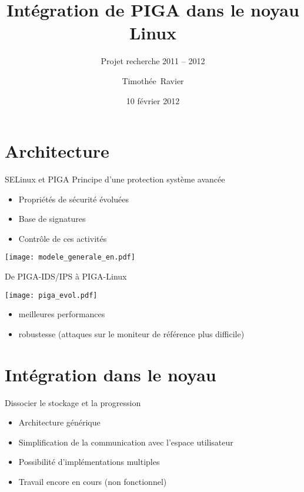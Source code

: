 \documentclass{beamer}
\title{\huge Intégration de PIGA dans le noyau Linux}
\subtitle{\Large Projet recherche 2011 -- 2012}
\author{\Large Timothée~Ravier}
\institute{ENSI de Bourges}
\date{10 février 2012}
\begin{document}
{
	\framenumberoff
	\watermarkoff
	\begin{frame}
	\titlepage
	\end{frame}
}

\section{Architecture}
\begin{frame}{SELinux et PIGA}
	Principe d'une protection système avancée
	\begin{itemize}
		\item Propriétés de sécurité évoluées
		\item Base de signatures
		\item Contrôle de ces activités
	\end{itemize}
	\vspace{-1cm}
	\hspace{1cm}
		\texttt{[image: modele\_generale\_en.pdf]}
\end{frame}

\begin{frame}{De PIGA-IDS/IPS à PIGA-Linux}
	\begin{center}
		\texttt{[image: piga\_evol.pdf]}
	\end{center}
	\vspace{-0.5cm}
	\begin{itemize}
		\item meilleures performances
		\item robustesse (attaques sur le moniteur de référence plus
difficile)
	\end{itemize}
\end{frame}

\section{Intégration dans le noyau}
\begin{frame}{Dissocier le stockage et la progression}
	\begin{itemize}
		\item Architecture générique
		\item Simplification de la communication avec l'espace utilisateur
		\item Possibilité d'implémentations multiples
		\item Travail encore en cours (non fonctionnel)
	\end{itemize}
\end{frame}
\end{document}
